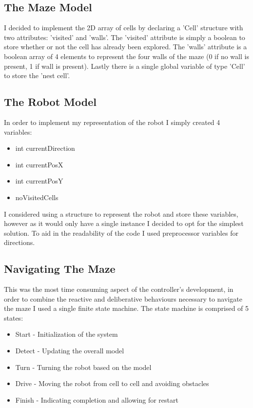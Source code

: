\documentclass[a4paper]{article}
\begin{document}
	\subsection{The Maze Model}
	I decided to implement the 2D array of cells by declaring a 'Cell' structure with two attributes: 'visited' and 'walls'. The 'visited' attribute is simply a boolean to store whether or not the cell has already been explored. The 'walls' attribute is a boolean array of 4 elements to represent the four walls of the maze (0 if no wall is present, 1 if wall is present). Lastly there is a single global variable of type 'Cell' to store the 'nest cell'.
	
	\subsection{The Robot Model}
	In order to implement my representation of the robot I simply created 4 variables:
	\begin{itemize}
		\item int currentDirection
		\item int currentPosX
		\item int currentPosY
		\item noVisitedCells
	\end{itemize}
	
	I considered using a structure to represent the robot and store these variables, however as it would only have a single instance I decided to opt for the simplest solution. To aid in the readability of the code I used preprocessor variables for directions.
	
	\subsection{Navigating The Maze}
	This was the most time consuming aspect of the controller's development, in order to combine the reactive and deliberative behaviours necessary to navigate the maze I used a single finite state machine. The state machine is comprised of 5 states:
	
	\begin{itemize}
		\item Start   - Initialization of the system 
		\item Detect  - Updating the overall model
		\item Turn    - Turning the robot based on the model
		\item Drive   - Moving the robot from cell to cell and avoiding obstacles
		\item Finish  - Indicating completion and allowing for restart
	\end{itemize}
	
\end{document}
